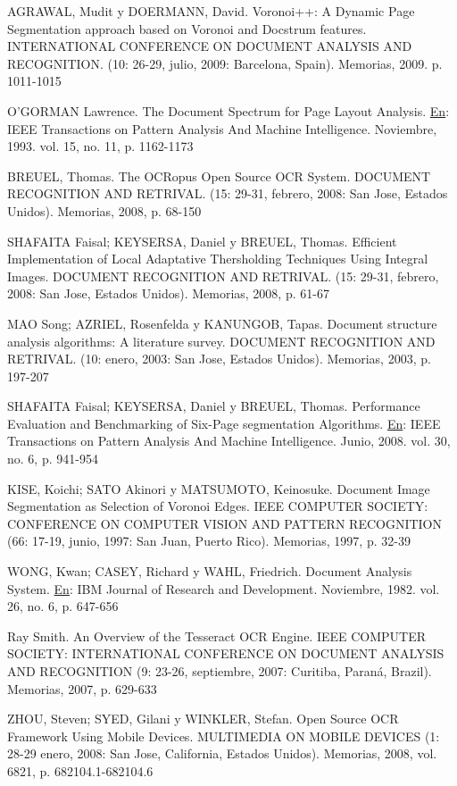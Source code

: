 \documentclass[a4paper, 11pt, oneside]{report}
\begin{document}
	AGRAWAL, Mudit y DOERMANN, David. Voronoi++: A Dynamic Page Segmentation approach based on Voronoi and Docstrum features. INTERNATIONAL CONFERENCE ON DOCUMENT ANALYSIS AND RECOGNITION. (10: 26-29, julio, 2009: Barcelona, Spain). Memorias, 2009. p. 1011-1015
	
	O'GORMAN Lawrence. The Document Spectrum for Page Layout Analysis. \underline{En}: IEEE Transactions on Pattern Analysis And Machine Intelligence. Noviembre, 1993. vol. 15, no. 11, p. 1162-1173
	
	BREUEL, Thomas. The OCRopus Open Source OCR System. DOCUMENT RECOGNITION AND RETRIVAL. (15: 29-31, febrero, 2008: San Jose, Estados Unidos). Memorias, 2008, p. 68-150
	
	SHAFAITA Faisal; KEYSERSA, Daniel y BREUEL, Thomas. Efficient Implementation of Local Adaptative Thersholding Techniques Using Integral Images. DOCUMENT RECOGNITION AND RETRIVAL. (15: 29-31, febrero, 2008: San Jose, Estados Unidos). Memorias, 2008, p. 61-67
	
	MAO Song; AZRIEL, Rosenfelda y KANUNGOB, Tapas. Document structure analysis algorithms: A literature survey. DOCUMENT RECOGNITION AND RETRIVAL. (10: enero, 2003: San Jose, Estados Unidos). Memorias, 2003, p. 197-207
	
	SHAFAITA Faisal; KEYSERSA, Daniel y BREUEL, Thomas. Performance Evaluation and Benchmarking of Six-Page segmentation Algorithms. \underline{En}: IEEE Transactions on Pattern Analysis And Machine Intelligence. Junio, 2008. vol. 30, no. 6, p. 941-954
	
	KISE, Koichi; SATO Akinori y MATSUMOTO, Keinosuke. Document Image Segmentation as Selection of Voronoi Edges. IEEE COMPUTER SOCIETY: CONFERENCE ON COMPUTER VISION AND PATTERN RECOGNITION (66: 17-19, junio, 1997: San Juan, Puerto Rico). Memorias, 1997, p. 32-39
	
	WONG, Kwan; CASEY, Richard y WAHL, Friedrich. Document Analysis System. \underline{En}: IBM Journal of Research and Development. Noviembre, 1982. vol. 26, no. 6, p. 647-656
	
	Ray Smith. An Overview of the Tesseract OCR Engine. IEEE COMPUTER SOCIETY: INTERNATIONAL CONFERENCE ON DOCUMENT ANALYSIS AND RECOGNITION (9: 23-26, septiembre, 2007: Curitiba, Paraná, Brazil). Memorias, 2007, p. 629-633
	
	ZHOU, Steven; SYED, Gilani y WINKLER, Stefan. Open Source OCR Framework Using Mobile Devices. MULTIMEDIA ON MOBILE DEVICES (1: 28-29 enero, 2008: San Jose, California, Estados Unidos). Memorias, 2008, vol. 6821, p. 682104.1-682104.6
	
\end{document}
